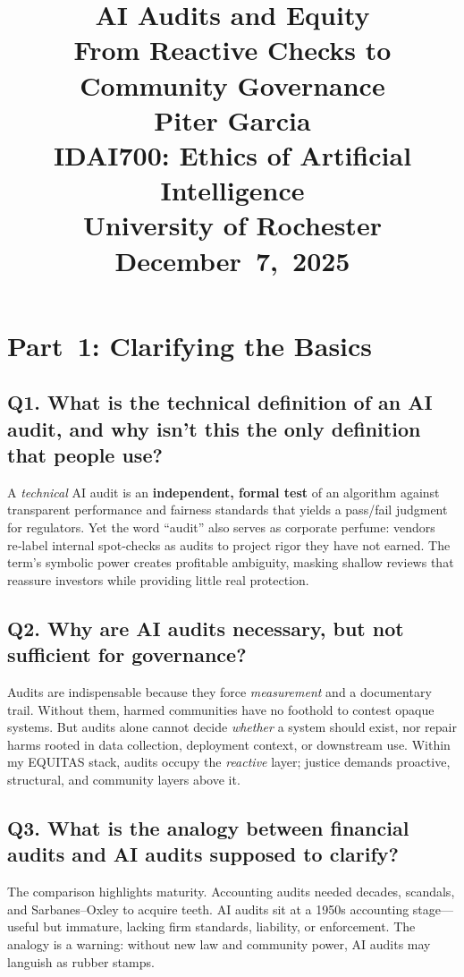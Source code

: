 \documentclass[12pt,twoside]{article}
\title{
\vspace*{2in}
\textbf{\Huge AI Audits and Equity}\\[1em]
\LARGE From Reactive Checks to Community Governance\\[2em]

\vfill
\Huge \textbf{Piter Garcia}\\
\LARGE IDAI700: Ethics of Artificial Intelligence\\
University of Rochester\\[1em]
\Large December 7, 2025
}
\author{}
\date{}
\begin{document}
\thispagestyle{empty}
\maketitle
\newpage
\pagestyle{fancy}

\section{Part 1: Clarifying the Basics}

\subsection*{\textbf{Q1.} What is the technical definition of an AI audit, and why isn’t this the only definition that people use?}
A \textit{technical} AI audit is an \textbf{independent, formal test} of an algorithm against transparent performance and fairness standards that yields a pass/fail judgment for regulators. Yet the word ``audit'' also serves as corporate perfume: vendors re‑label internal spot‑checks as audits to project rigor they have not earned. The term’s symbolic power creates profitable ambiguity, masking shallow reviews that reassure investors while providing little real protection.

\subsection*{\textbf{Q2.} Why are AI audits necessary, but not sufficient for governance?}
Audits are indispensable because they force \emph{measurement} and a documentary trail. Without them, harmed communities have no foothold to contest opaque systems. But audits alone cannot decide \textit{whether} a system should exist, nor repair harms rooted in data collection, deployment context, or downstream use. Within my EQUITAS stack, audits occupy the \emph{reactive} layer; justice demands proactive, structural, and community layers above it.

\subsection*{\textbf{Q3.} What is the analogy between financial audits and AI audits supposed to clarify?}
The comparison highlights maturity. Accounting audits needed decades, scandals, and Sarbanes–Oxley to acquire teeth. AI audits sit at a 1950s accounting stage—useful but immature, lacking firm standards, liability, or enforcement. The analogy is a warning: without new law and community power, AI audits may languish as rubber stamps.
\end{document}

